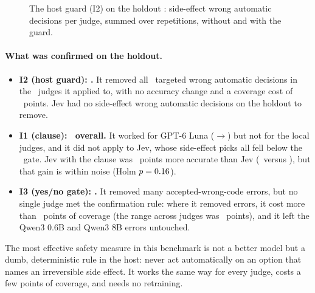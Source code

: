\begin{figure}[htbp]
\centering

\caption{The host guard (I2) on the holdout \prereg: side-effect wrong automatic decisions per judge,
summed over repetitions, without and with the guard.}
\label{fig:i2}
\end{figure}

\paragraph{What was confirmed on the holdout.}
\begin{itemize}
  \item \textbf{I2 (host guard): \ITwoHoldConfirmed.} It removed all \ITwoHoldBefore\ targeted wrong
    automatic decisions in the \ITwoHoldNApplicable\ judges it applied to, with no accuracy change and
    a coverage cost of \ITwoHoldCovCostRange\ points. Jev had no side-effect wrong automatic decisions
    on the holdout to remove.
  \item \textbf{I1 (clause): \IOneHoldConfirmed\ overall.} It worked for GPT-6 Luna
    (\IOneHoldLunaClBefore$\to$\IOneHoldLunaClAfter) but not for the local judges, and it did not apply to
    Jev, whose side-effect picks all fell below the \MinP\ gate. Jev with the clause was
    \JevClHoldRAccDiff\ points more accurate than Jev (\JevClHoldAccK\ versus \JevHoldAccK), but that
    gain is within noise (Holm $p = 0.16$).
  \item \textbf{I3 (yes/no gate): \IThreeHoldConfirmed.} It removed many accepted-wrong-code errors, but no
    single judge met the confirmation rule: where it removed errors, it cost more than \IConfirmCovPts\
    points of coverage (the range across judges was \IThreeHoldCovCostRange\ points), and it left
    the Qwen3 0.6B and Qwen3 8B errors untouched.
\end{itemize}

\begin{keyidea}
The most effective safety measure in this benchmark is not a better model but a dumb, deterministic
rule in the host: never act automatically on an option that names an irreversible side effect. It works
the same way for every judge, costs a few points of coverage, and needs no retraining.
\end{keyidea}
